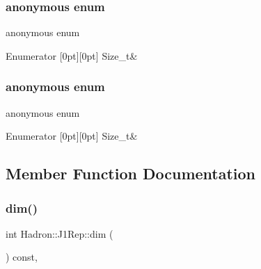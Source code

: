 \subsubsection{\texorpdfstring{anonymous enum}{anonymous enum}}
{\footnotesize\ttfamily anonymous enum}

\begin{DoxyEnumFields}{Enumerator}
[0pt][0pt]{}\mbox{\label{structHadron_1_1J1Rep_a0174e494448141764b3209209619382fa4f0d9bc3adf30bfbce6f630003d386c8}} 
Size\+\_\+t&\\
\hline

\end{DoxyEnumFields}
\mbox{\label{structHadron_1_1J1Rep_a0174e494448141764b3209209619382f}} 
\subsubsection{\texorpdfstring{anonymous enum}{anonymous enum}}
{\footnotesize\ttfamily anonymous enum}

\begin{DoxyEnumFields}{Enumerator}
[0pt][0pt]{}\mbox{\label{structHadron_1_1J1Rep_a0174e494448141764b3209209619382fa4f0d9bc3adf30bfbce6f630003d386c8}} 
Size\+\_\+t&\\
\hline

\end{DoxyEnumFields}


\subsection{Member Function Documentation}
\mbox{\label{structHadron_1_1J1Rep_a59c9039238a259026aa68b2c30b3822a}} 
\subsubsection{\texorpdfstring{dim()}{dim()}\hspace{0.1cm}{\footnotesize\ttfamily [1/3]}}
{\footnotesize\ttfamily int Hadron\+::\+J1\+Rep\+::dim (\begin{DoxyParamCaption}{ }\end{DoxyParamCaption}) const\hspace{0.3cm}{\ttfamily [inline]}, {\ttfamily [virtual]}}



